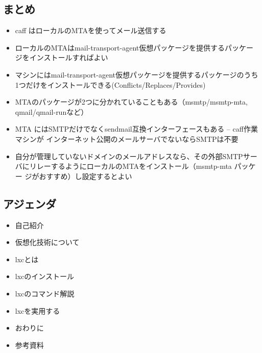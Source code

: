 \documentclass[mingoth,a4paper]{jsarticle}
\begin{document}
\subsection{まとめ}
\begin{itemize}
 \item caff はローカルのMTAを使ってメール送信する
 \item ローカルのMTAはmail-transport-agent仮想パッケージを提供するパッケー
       ジをインストールすればよい
 \item マシンにはmail-transport-agent仮想パッケージを提供するパッケージのうち
       1つだけをインストールできる(Conflicts/Replaces/Provides)
 \item MTAのパッケージが2つに分かれていることもある（msmtp/msmtp-mta,
       qmail/qmail-runなど）
 \item MTA にはSMTPだけでなくsendmail互換インターフェースもある -- caff作業マシンが
       インターネット公開のメールサーバでないならSMTPは不要
 \item 自分が管理していないドメインのメールアドレスなら、その外部SMTPサー
       バにリレーするようにローカルのMTAをインストール（msmtp-mta パッケー
       ジがおすすめ）し設定するとよい
\end{itemize}



\subsection{アジェンダ}
  \begin{itemize}
  \item 自己紹介
  \item 仮想化技術について
  \item lxcとは
  \item lxcのインストール
  \item lxcのコマンド解説
  \item lxcを実用する
  \item おわりに
  \item 参考資料
  \end{itemize}
\end{document}
